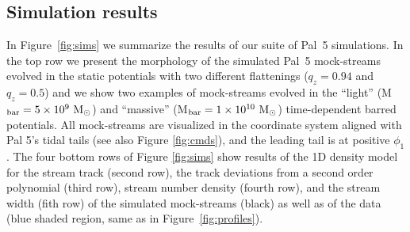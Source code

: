\documentclass[twocolumn]{aastex62}
\newcommand{\msun}{\textrm{M}_\odot}
\begin{document}
\subsection{Simulation results}
\label{sec:sim_results}
In Figure~\ref{fig:sims} we summarize the results of our suite of Pal~5 simulations.
In the top row we present the morphology of the simulated Pal~5 mock-streams evolved in the static potentials with two different flattenings ($q_z = 0.94$ and $q_z = 0.5$) and we show two examples of mock-streams evolved in the ``light'' (M$_{\rm bar} = 5\times 10^9~\msun$) and ``massive'' (M$_{\rm bar} = 1\times 10^{10}~\msun$) time-dependent barred potentials.
All mock-streams are visualized in the coordinate system aligned with Pal 5's tidal tails (see also Figure \ref{fig:cmds}), and the leading tail is at positive $\phi_1$.
The four bottom rows of Figure \ref{fig:sims} show results of the 1D density model for the stream track (second row), the track deviations from a second order polynomial (third row), stream number density (fourth row), and the stream width (fith row) of the simulated mock-streams (black) as well as of the data (blue shaded region, same as in Figure~\ref{fig:profiles}).
\end{document}
